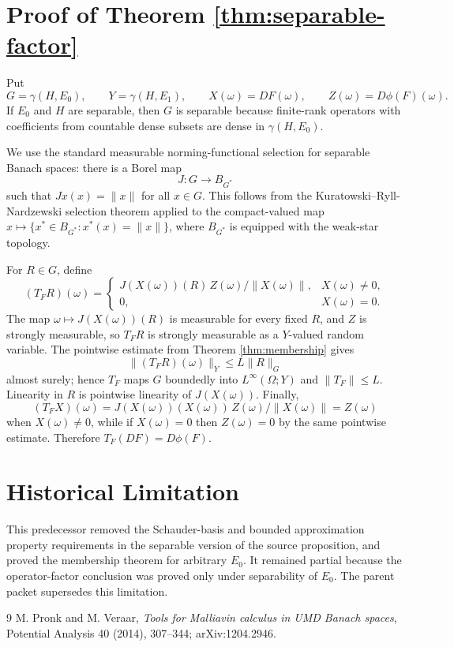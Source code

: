 \documentclass[11pt]{article}
\newcommand{\g}{\gamma}
\begin{document}
\section*{Proof of Theorem \ref{thm:separable-factor}}

Put
\[
  G=\g(H,E_0),\qquad Y=\g(H,E_1),\qquad X(\omega)=DF(\omega),\qquad
  Z(\omega)=D\phi(F)(\omega).
\]
If \(E_0\) and \(H\) are separable, then \(G\) is separable because finite-rank
operators with coefficients from countable dense subsets are dense in
\(\g(H,E_0)\).

We use the standard measurable norming-functional selection for separable
Banach spaces: there is a Borel map
\[
  J:G\to B_{G^*}
\]
such that \(Jx(x)=\|x\|\) for all \(x\in G\).  This follows from the
Kuratowski--Ryll-Nardzewski selection theorem applied to the compact-valued map
\(x\mapsto\{x^*\in B_{G^*}:x^*(x)=\|x\|\}\), where \(B_{G^*}\) is equipped with
the weak-star topology.

For \(R\in G\), define
\[
  (T_FR)(\omega)=
  \begin{cases}
    J(X(\omega))(R)\, Z(\omega)/\|X(\omega)\|, & X(\omega)\neq0,\\[3pt]
    0, & X(\omega)=0 .
  \end{cases}
\]
The map \(\omega\mapsto J(X(\omega))(R)\) is measurable for every fixed
\(R\), and \(Z\) is strongly measurable, so \(T_FR\) is strongly measurable as
a \(Y\)-valued random variable.  The pointwise estimate from
Theorem \ref{thm:membership} gives
\[
  \|(T_FR)(\omega)\|_Y\leq L\|R\|_G
\]
almost surely; hence \(T_F\) maps \(G\) boundedly into
\(L^\infty(\Omega;Y)\) and \(\|T_F\|\leq L\).  Linearity in \(R\) is pointwise
linearity of \(J(X(\omega))\).  Finally,
\[
  (T_FX)(\omega)
  =J(X(\omega))(X(\omega))\, Z(\omega)/\|X(\omega)\|
  =Z(\omega)
\]
when \(X(\omega)\neq0\), while if \(X(\omega)=0\) then \(Z(\omega)=0\) by the
same pointwise estimate.  Therefore \(T_F(DF)=D\phi(F)\).

\section*{Historical Limitation}

This predecessor removed the Schauder-basis and bounded approximation property
requirements in the separable version of the source proposition, and proved
the membership theorem for arbitrary \(E_0\).  It remained partial because the
operator-factor conclusion was proved only under separability of \(E_0\).
The parent packet supersedes this limitation.

\begin{thebibliography}{9}
M. Pronk and M. Veraar,
\emph{Tools for Malliavin calculus in UMD Banach spaces},
Potential Analysis 40 (2014), 307--344; arXiv:1204.2946.
\end{thebibliography}
\end{document}
